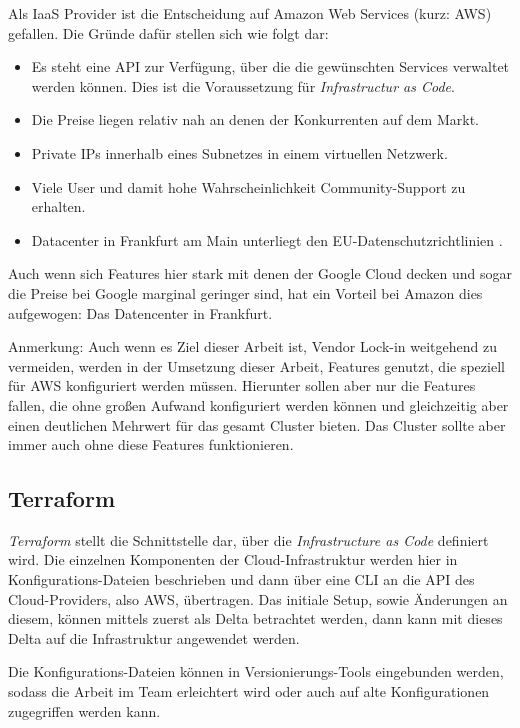 Als IaaS Provider ist die Entscheidung auf Amazon Web Services (kurz: AWS) \cite{aws} gefallen.
Die Gründe dafür stellen sich wie folgt dar:
\begin{itemize}
  \item Es steht eine API zur Verfügung, über die die gewünschten Services
  verwaltet werden können. Dies ist die Voraussetzung für \emph{Infrastructur as Code}.
  \item Die Preise liegen relativ nah an denen der Konkurrenten auf dem Markt.
  \cite{pricingcompare}
  \item Private IPs innerhalb eines Subnetzes in einem virtuellen Netzwerk.
  \item Viele User und damit hohe Wahrscheinlichkeit Community-Support zu erhalten.
  \item Datacenter in Frankfurt am Main unterliegt den EU-Datenschutzrichtlinien \cite{awsEU}.
\end{itemize}
Auch wenn sich Features hier stark mit denen der Google Cloud decken und sogar
die Preise
bei Google marginal geringer sind,
hat ein Vorteil bei Amazon dies aufgewogen: Das Datencenter
in Frankfurt.

\begin{tcolorbox}
Anmerkung: Auch wenn es Ziel dieser Arbeit ist, Vendor Lock-in weitgehend zu
vermeiden,
werden in der Umsetzung dieser Arbeit, Features genutzt, die speziell für AWS
konfiguriert werden müssen.
Hierunter sollen aber nur die Features fallen, die ohne großen Aufwand
konfiguriert werden können und gleichzeitig aber einen deutlichen Mehrwert
für das gesamt Cluster bieten. Das Cluster sollte aber immer auch ohne diese
Features funktionieren.
\end{tcolorbox}

\subsection{Terraform}

\emph{Terraform} \cite{terraform} stellt die Schnittstelle dar, über die
\emph{Infrastructure as Code}
definiert wird.
Die einzelnen Komponenten der Cloud-Infrastruktur werden hier in
Konfigurations-Dateien
beschrieben und dann über eine CLI an die API des Cloud-Providers, also AWS,
übertragen.
Das initiale Setup, sowie Änderungen an diesem, können mittels
 zuerst als Delta betrachtet werden, dann kann
mit  dieses Delta auf die Infrastruktur
angewendet werden.

Die Konfigurations-Dateien können in Versionierungs-Tools eingebunden werden,
sodass die Arbeit im Team erleichtert wird oder auch auf alte Konfigurationen
zugegriffen werden kann.

